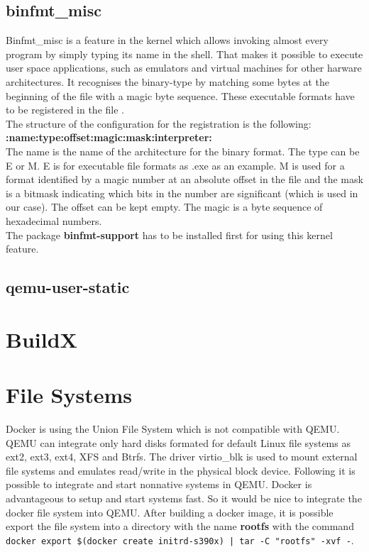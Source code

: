 \subsection{binfmt\_misc}

Binfmt\_misc is a feature in the kernel which allows invoking almost every program by simply typing its name in the shell. That makes it possible to execute user space applications, such as emulators and virtual machines for other harware architectures. It recognises the binary-type by matching some bytes at the beginning of the file with a magic byte sequence. These executable formats have to be registered in the file .\\
The structure of the configuration for the registration is the following: \textbf{:name:type:offset:magic:mask:interpreter:} \\
The name is the name of the architecture for the binary format. The type can be E or M. E is for executable file formats as .exe as an example. M is used for a format identified by a magic number at an absolute offset in the file and the mask is a bitmask indicating which bits in the number are significant\cite{Slackware2020} (which is used in our case). The offset can be kept empty. The magic is a byte sequence of hexadecimal numbers.\\
The package \textbf{binfmt-support} has to be installed first for using this kernel feature. 

\subsection{qemu-user-static}

\section{BuildX}

\section{File Systems}

Docker is using the Union File System which is not compatible with QEMU.
QEMU can integrate only hard disks formated for default Linux file systems as ext2, ext3, ext4, XFS and Btrfs. 
The driver virtio\_blk is used to mount external file systems and emulates read/write in the physical block device\cite{Barboza2018}. Following it is possible to integrate and start nonnative systems in QEMU. 
Docker is advantageous to setup and start systems fast. 
So it would be nice to integrate the docker file system into QEMU. After building a docker image, it is possible export the file system into a directory with the name \textbf{rootfs} with the command \lstinline!docker export $(docker create initrd-s390x) | tar -C "rootfs" -xvf -!. \\

